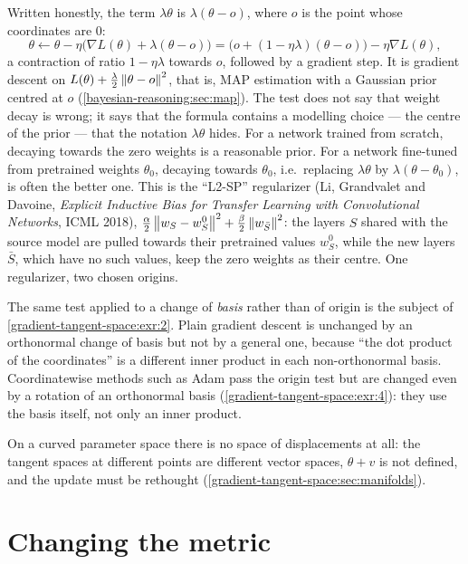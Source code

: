 \begin{notechapter}
\begin{example}\label{gradient-tangent-space:ex:decay}
Written honestly, the term $\lambda\theta$ is $\lambda(\theta - o)$, where $o$ is the point whose coordinates are $0$:
\[
  \theta\leftarrow\theta - \eta\bigl(\nabla L(\theta) + \lambda(\theta - o)\bigr)
  = \bigl(o + (1 - \eta\lambda)(\theta - o)\bigr) - \eta\nabla L(\theta),
\]
a contraction of ratio $1 - \eta\lambda$ towards $o$, followed by a gradient step. It is gradient descent
on $L(\theta) + \frac\lambda2\left\|\theta - o\right\|^2$, that is, MAP estimation with a Gaussian prior centred at $o$
(\cref{bayesian-reasoning:sec:map}). The test does not say that weight decay is wrong; it says that
the formula contains a modelling choice --- the centre of the prior --- that the notation $\lambda\theta$ hides.
For a network trained from scratch, decaying towards the zero weights is a reasonable prior. For a
network fine-tuned from pretrained weights $\theta_0$, decaying towards $\theta_0$, i.e.\ replacing $\lambda\theta$ by
$\lambda(\theta - \theta_0)$, is often the better one. This is the ``L2-SP'' regularizer (Li, Grandvalet and
Davoine, \emph{Explicit Inductive Bias for Transfer Learning with Convolutional Networks}, ICML
2018), $\frac\alpha2\left\|w_S - w_S^0\right\|^2 + \frac\beta2\left\|w_{\bar S}\right\|^2$: the layers $S$ shared with the source model are pulled
towards their pretrained values $w_S^0$, while the new layers $\bar S$, which have no such values,
keep the zero weights as their centre. One regularizer, two chosen origins.
\end{example}

The same test applied to a change of \emph{basis} rather than of origin is the subject of
\cref{gradient-tangent-space:exr:2}. Plain gradient descent is unchanged by an orthonormal change
of basis but not by a general one, because ``the dot product of the coordinates'' is a different
inner product in each non-orthonormal basis. Coordinatewise methods such as Adam pass the origin
test but are changed even by a rotation of an orthonormal basis
(\cref{gradient-tangent-space:exr:4}): they use the basis itself, not only an inner product.

On a curved parameter space there is no space of displacements at all: the tangent spaces at
different points are different vector spaces, $\theta + v$ is not defined, and the update must be
rethought (\cref{gradient-tangent-space:sec:manifolds}).

\section{Changing the metric}\label{gradient-tangent-space:sec:metric}


\end{notechapter}
